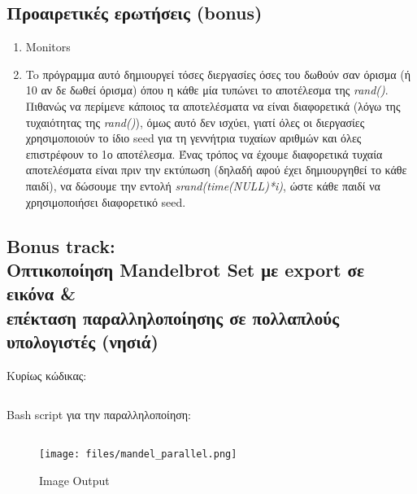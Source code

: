 \documentclass[a4paper,10pt]{article} \usepackage{anysize}
\begin{document}
\subsection{Προαιρετικές ερωτήσεις (bonus)} 

\begin{enumerate}
	\item Monitors


	\item To πρόγραμμα αυτό δημιουργεί τόσες διεργασίες όσες του δωθούν σαν
		όρισμα (ή 10 αν δε δωθεί όρισμα) όπου η κάθε μία τυπώνει το αποτέλεσμα
		της \emph{rand()}. Πιθανώς να περίμενε κάποιος τα αποτελέσματα να είναι
		διαφορετικά (λόγω της τυχαιότητας της \emph{rand()}), όμως αυτό δεν ισχύει,
		γιατί όλες οι διεργασίες χρησιμοποιούν το ίδιο seed για τη γεννήτρια
		τυχαίων αριθμών και όλες επιστρέφουν το 1ο αποτέλεσμα.  Ένας τρόπος να
		έχουμε διαφορετικά τυχαία αποτελέσματα είναι πριν την εκτύπωση (δηλαδή
		αφού έχει δημιουργηθεί το κάθε παιδί), να δώσουμε την εντολή
		\emph{srand(time(NULL)*i)}, ώστε κάθε παιδί να χρησιμοποιήσει
		διαφορετικό seed.   
\end{enumerate}

\subsection{Bonus track: \\Οπτικοποίηση Mandelbrot Set με export σε εικόνα \&
\\επέκταση παραλληλοποίησης σε πολλαπλούς υπολογιστές (νησιά)}
\noindent Κυρίως κώδικας:

\inputminted[linenos,fontsize=\footnotesize,frame=leftline]{c}{files/mandel_parallel.c}

\noindent Bash script για την παραλληλοποίηση:

\inputminted[linenos,fontsize=\footnotesize,frame=leftline]{bash}{files/runem.sh}
\begin{figure}[H]
	\centering
	\texttt{[image: files/mandel\_parallel.png]}
	\caption{Image Output}
\end{figure}
\end{document}
